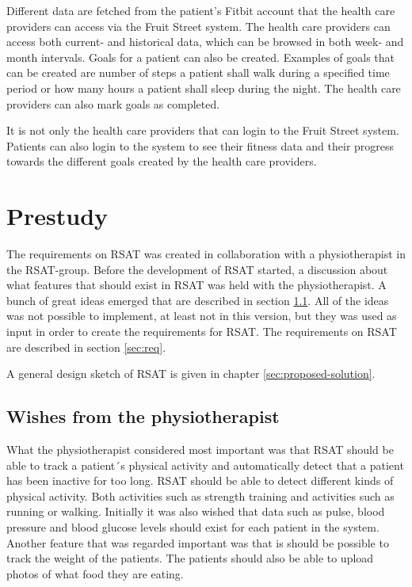 \documentclass{cslthse-msc}
\begin{document}
Different data are fetched from the patient's Fitbit account that the health care providers can access via the Fruit Street system. The health care providers can access both current- and historical data, which can be browsed in both week- and month intervals. Goals for a patient can also be created. Examples of goals that can be created are number of steps a patient shall walk during a specified time period or how many hours a patient shall sleep during the night. The health care providers can also mark goals as completed. 

It is not only the health care providers that can login to the Fruit Street system. Patients can also login to the system to see their fitness data and their progress towards the different goals created by the health care providers\cite{FruitStreetVideo}.


\chapter{Prestudy}

The requirements on RSAT was created in collaboration with a physiotherapist in the RSAT-group. Before the development of RSAT started, a discussion about what features that should exist in RSAT was held with the physiotherapist. A bunch of great ideas emerged that are described in section \ref{sec:wishes}. All of the ideas was not possible to implement, at least not in this version, but they was used as input in order to create the requirements for RSAT. The requirements on RSAT are described in section \ref{sec:req}.

A general design sketch of RSAT is given in chapter \ref{sec:proposed-solution}.


\section{Wishes from the physiotherapist}
\label{sec:wishes}

What the physiotherapist considered most important was that RSAT should be able to track a patient´s physical activity and automatically detect that a patient has been inactive for too long. RSAT should be able to detect different kinds of physical activity. Both activities such as strength training and activities such as running or walking. Initially it was also wished that data such as pulse, blood pressure and blood glucose levels should exist for each patient in the system. Another feature that was regarded important was that is should be possible to track the weight of the patients. The patients should also be able to upload photos of what food they are eating.
\end{document}
